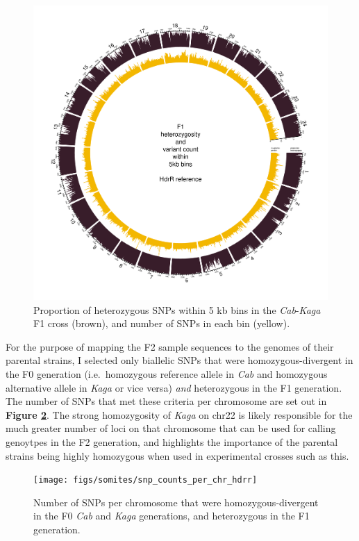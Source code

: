 \documentclass[
]{book}
\begin{document}
\begin{figure}
\includegraphics[width=1\linewidth]{figs/somites/F1} \caption{Proportion of heterozygous SNPs within 5 kb bins in the \emph{Cab}-\emph{Kaga} F1 cross (brown), and number of SNPs in each bin (yellow).}\label{fig:somite-f1}
\end{figure}

For the purpose of mapping the F2 sample sequences to the genomes of their parental strains, I selected only biallelic SNPs that were homozygous-divergent in the F0 generation (i.e.~homozygous reference allele in \emph{Cab} and homozygous alternative allele in \emph{Kaga} or vice versa) \emph{and} heterozygous in the F1 generation. The number of SNPs that met these criteria per chromosome are set out in \textbf{Figure \ref{fig:snp-counts-per-chrom}}. The strong homozygosity of \emph{Kaga} on chr22 is likely responsible for the much greater number of loci on that chromosome that can be used for calling genoytpes in the F2 generation, and highlights the importance of the parental strains being highly homozygous when used in experimental crosses such as this.



\begin{figure}
\texttt{[image: figs/somites/snp\_counts\_per\_chr\_hdrr]} \caption{Number of SNPs per chromosome that were homozygous-divergent in the F0 \emph{Cab} and \emph{Kaga} generations, and heterozygous in the F1 generation.}\label{fig:snp-counts-per-chrom}
\end{figure}
\end{document}
